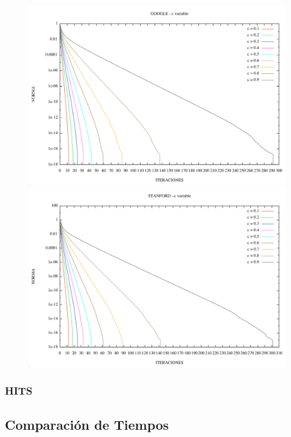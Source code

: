 \begin{figure}
\begin{center}
    \includegraphics[scale=0.5]{imagenes/pagerank_google_norma.png}
  \includegraphics[scale=0.5]{imagenes/pagerank_stanford_norma.png}
    \end{center}
\end{figure}

\FloatBarrier




\subsubsection {HITS}
\subsection{Comparación de Tiempos}
 
